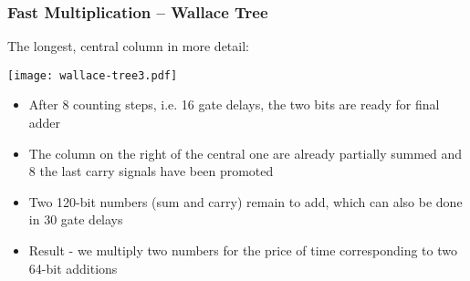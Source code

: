 \documentclass{beamer}
\begin{document}
\begin{frame}[shrink=5]
\frametitle{Fast Multiplication -- Wallace Tree}

The longest, central column in more detail:
\begin{center}
\texttt{[image: wallace-tree3.pdf]}
\end{center}

\begin{itemize}
\item After 8 counting steps, i.e. 16 gate delays, the two bits are ready for final adder
\item The column on the right of the central one are already partially summed and 8 the last carry signals have been promoted
\item Two 120-bit numbers (sum and carry) remain to add, which can also be done in 30 gate delays
\item Result - we multiply two numbers for the price of time corresponding to two 64-bit additions
\end{itemize}

\end{frame}
\end{document}

